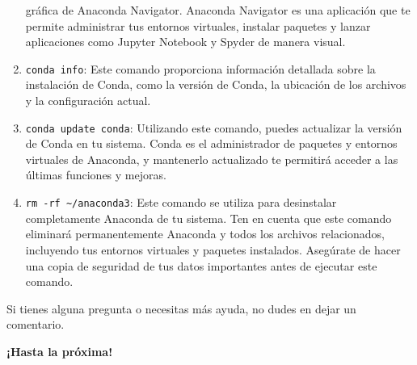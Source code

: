 \documentclass[
  a4paper,
]{article}
\begin{document}
\begin{enumerate}
  gráfica de Anaconda Navigator. Anaconda Navigator es una aplicación
  que te permite administrar tus entornos virtuales, instalar paquetes y
  lanzar aplicaciones como Jupyter Notebook y Spyder de manera visual.
\item
  \texttt{conda\ info}: Este comando proporciona información detallada
  sobre la instalación de Conda, como la versión de Conda, la ubicación
  de los archivos y la configuración actual.
\item
  \texttt{conda\ update\ conda}: Utilizando este comando, puedes
  actualizar la versión de Conda en tu sistema. Conda es el
  administrador de paquetes y entornos virtuales de Anaconda, y
  mantenerlo actualizado te permitirá acceder a las últimas funciones y
  mejoras.
\item
  \texttt{rm\ -rf\ \textasciitilde{}/anaconda3}: Este comando se utiliza
  para desinstalar completamente Anaconda de tu sistema. Ten en cuenta
  que este comando eliminará permanentemente Anaconda y todos los
  archivos relacionados, incluyendo tus entornos virtuales y paquetes
  instalados. Asegúrate de hacer una copia de seguridad de tus datos
  importantes antes de ejecutar este comando.
\end{enumerate}

Si tienes alguna pregunta o necesitas más ayuda, no dudes en dejar un
comentario.

\textbf{¡Hasta la próxima!}


\printbibliography
\end{document}
